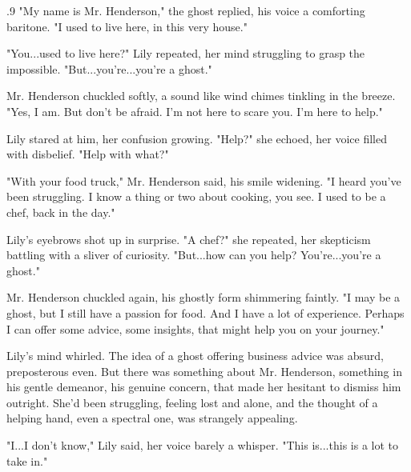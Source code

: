 \documentclass{article}
\newcommand{\Agentsroomzs}{\textsc{Agents' Room$_{ZS}$}}
\begin{document}
\begin{tcolorbox}[colback=white, colframe=gray!30!white, coltitle=black, parskip=5mm, title=
    \textbf{System output: \Agentsroomzs}, breakable]
\begin{spacing}{.9}
"My name is Mr. Henderson," the ghost replied, his voice a comforting baritone.  "I used to live here, in this very house."\\\par

"You...used to live here?" Lily repeated, her mind struggling to grasp the impossible.  "But...you're...you're a ghost."\\\par

Mr. Henderson chuckled softly, a sound like wind chimes tinkling in the breeze.  "Yes, I am.  But don't be afraid.  I'm not here to scare you.  I'm here to help."\\\par

Lily stared at him, her confusion growing.  "Help?" she echoed, her voice filled with disbelief.  "Help with what?"\\\par

"With your food truck," Mr. Henderson said, his smile widening.  "I heard you've been struggling.  I know a thing or two about cooking, you see.  I used to be a chef, back in the day."
\\\par
Lily's eyebrows shot up in surprise.  "A chef?" she repeated, her skepticism battling with a sliver of curiosity.  "But...how can you help?  You're...you're a ghost."\\\par

Mr. Henderson chuckled again, his ghostly form shimmering faintly.  "I may be a ghost, but I still have a passion for food.  And I have a lot of experience.  Perhaps I can offer some advice, some insights, that might help you on your journey."\\\par

Lily's mind whirled.  The idea of a ghost offering business advice was absurd, preposterous even.  But there was something about Mr. Henderson, something in his gentle demeanor, his genuine concern, that made her hesitant to dismiss him outright.  She'd been struggling, feeling lost and alone, and the thought of a helping hand, even a spectral one, was strangely appealing.\\\par

"I...I don't know," Lily said, her voice barely a whisper.  "This is...this is a lot to take in."\\\par


\end{spacing}
\end{tcolorbox}
\end{document}
